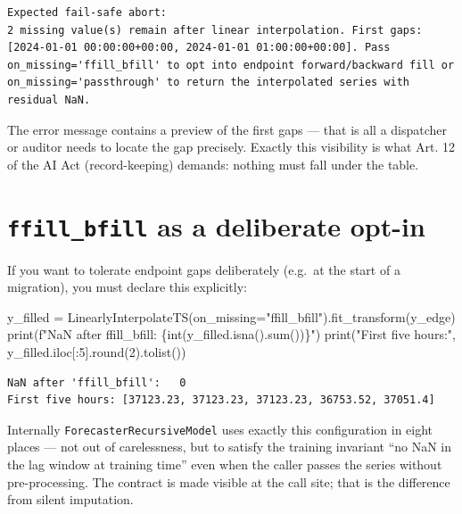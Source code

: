 \documentclass[
  english,
  letterpaper,
]{scrbook}
\newenvironment{Shaded}{\begin{snugshade}}{\end{snugshade}}
\newcommand{\BuiltInTok}[1]{\textcolor[rgb]{0.00,0.23,0.31}{#1}}
\newcommand{\DecValTok}[1]{\textcolor[rgb]{0.68,0.00,0.00}{#1}}
\newcommand{\NormalTok}[1]{\textcolor[rgb]{0.00,0.23,0.31}{#1}}
\newcommand{\OperatorTok}[1]{\textcolor[rgb]{0.37,0.37,0.37}{#1}}
\newcommand{\SpecialCharTok}[1]{\textcolor[rgb]{0.37,0.37,0.37}{#1}}
\newcommand{\SpecialStringTok}[1]{\textcolor[rgb]{0.13,0.47,0.30}{#1}}
\newcommand{\StringTok}[1]{\textcolor[rgb]{0.13,0.47,0.30}{#1}}
\begin{document}
\begin{verbatim}
Expected fail-safe abort:
2 missing value(s) remain after linear interpolation. First gaps: [2024-01-01 00:00:00+00:00, 2024-01-01 01:00:00+00:00]. Pass on_missing='ffill_bfill' to opt into endpoint forward/backward fill or on_missing='passthrough' to return the interpolated series with residual NaN.
\end{verbatim}

The error message contains a preview of the first gaps --- that is all a
dispatcher or auditor needs to locate the gap precisely. Exactly this
visibility is what Art. 12 of the AI Act (record-keeping) demands:
nothing must fall under the table.

\section{\texorpdfstring{\texttt{ffill\_bfill} as a deliberate
opt-in}{ffill\_bfill as a deliberate opt-in}}\label{ffill_bfill-as-a-deliberate-opt-in}

If you want to tolerate endpoint gaps deliberately (e.g.~at the start of
a migration), you must declare this explicitly:

\protect{}\label{cr3-ffill}
\begin{Shaded}
\begin{Highlighting}[]
\NormalTok{y\_filled }\OperatorTok{=}\NormalTok{ LinearlyInterpolateTS(on\_missing}\OperatorTok{=}\StringTok{"ffill\_bfill"}\NormalTok{).fit\_transform(y\_edge)}
\BuiltInTok{print}\NormalTok{(}\SpecialStringTok{f"NaN after \textquotesingle{}ffill\_bfill\textquotesingle{}:   }\SpecialCharTok{\{}\BuiltInTok{int}\NormalTok{(y\_filled.isna().}\BuiltInTok{sum}\NormalTok{())}\SpecialCharTok{\}}\SpecialStringTok{"}\NormalTok{)}
\BuiltInTok{print}\NormalTok{(}\StringTok{"First five hours:"}\NormalTok{, y\_filled.iloc[:}\DecValTok{5}\NormalTok{].}\BuiltInTok{round}\NormalTok{(}\DecValTok{2}\NormalTok{).tolist())}
\end{Highlighting}
\end{Shaded}

\begin{verbatim}
NaN after 'ffill_bfill':   0
First five hours: [37123.23, 37123.23, 37123.23, 36753.52, 37051.4]
\end{verbatim}

Internally \texttt{ForecasterRecursiveModel} uses exactly this
configuration in eight places --- not out of carelessness, but to
satisfy the training invariant ``no NaN in the lag window at training
time'' even when the caller passes the series without pre-processing.
The contract is made visible at the call site; that is the difference
from silent imputation.
\end{document}
